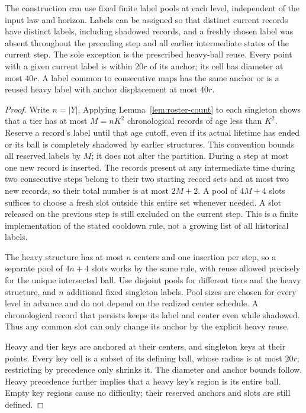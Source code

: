 \begin{lemma}\label{lem:fixed-alphabet}
The construction can use fixed finite label pools at each level,
independent of the input law and horizon.  Labels can be assigned so that
distinct current records have distinct labels, including shadowed records,
and a freshly chosen label was absent throughout the preceding step and
all earlier intermediate states of the current step.  The sole exception
is the prescribed heavy-ball reuse.  Every point with a given current
label is within \(20r\) of its anchor; its cell has diameter at most
\(40r\).  A label common to consecutive maps has the same anchor or is
a reused heavy label with anchor displacement at most \(40r\).
\end{lemma}
\begin{proof}
Write \(n=|Y|\).  Applying Lemma~\ref{lem:roster-count} to each singleton
shows that a tier has at most \(M=nK^2\) chronological records of age
less than \(K^2\).  Reserve a record's label until that age cutoff,
even if its actual lifetime has ended or its ball is completely shadowed
by earlier structures.  This convention bounds all reserved labels by
\(M\); it does not alter the partition.  During a step at most one new
record is inserted.  The records present at any intermediate time during
two consecutive steps belong to their two starting record sets and at
most two new records, so their total number is at most \(2M+2\).
A pool of \(4M+4\) slots suffices to choose a fresh slot outside this
entire set whenever needed.  A slot released on the previous step is
still excluded on the current step.  This is a finite implementation of
the stated cooldown rule, not a growing list of all historical labels.

The heavy structure has at most \(n\) centers and one insertion per step,
so a separate pool of \(4n+4\) slots works by the same rule, with reuse
allowed precisely for the unique intersected ball.  Use disjoint pools
for different tiers and the heavy structure, and \(n\) additional fixed
singleton labels.  Pool sizes are chosen for every level in advance and
do not depend on the realized center schedule.  A chronological record
that persists keeps its label and center even while shadowed.  Thus any
common slot can only change its anchor by the explicit heavy reuse.

Heavy and tier keys are anchored at their centers, and singleton keys at
their points.  Every key cell is a subset of its defining ball, whose
radius is at most \(20r\); restricting by precedence only shrinks it.
The diameter and anchor bounds follow.  Heavy precedence further implies
that a heavy key's region is its entire ball.  Empty key regions cause
no difficulty; their reserved anchors and slots are still defined.
\end{proof}

